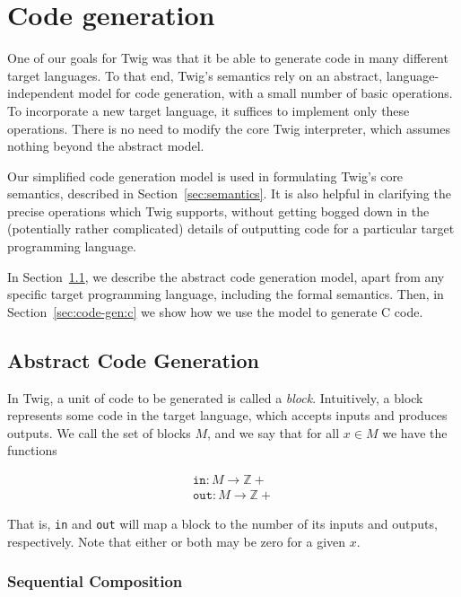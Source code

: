 
\section{Code generation}
\label{sec:code-gen}

One of our goals for Twig was that it be able to generate code in many different target languages. To that end, Twig's semantics rely on an abstract, language-independent model for code generation, with a small number of basic operations. To incorporate a new target language, it suffices to implement only these operations. There is no need to modify the core Twig interpreter, which assumes nothing beyond the abstract model.

Our simplified code generation model is used in formulating Twig's core semantics, described in Section~\ref{sec:semantics}. It is also helpful in clarifying the precise operations which Twig supports, without getting bogged down in the (potentially rather complicated) details of outputting code for a particular target programming language.

In Section~\ref{sec:code-gen:abstract}, we describe the abstract code generation model, apart from any specific target programming language, including the formal semantics. Then, in Section~\ref{sec:code-gen:c} we show how we use the model to generate C code.

\subsection{Abstract Code Generation}
\label{sec:code-gen:abstract}

In Twig, a unit of code to be generated is called a \emph{block}. Intuitively, a block represents some code in the target language, which accepts inputs and produces outputs. We call the set of blocks $M$, and we say that for all $x \in M$ we have the functions 

\begin{eqnarray*}
\mathtt{in}  : M \to \mathbb{Z}+\\
\mathtt{out} : M \to \mathbb{Z}+
\end{eqnarray*}

That is, \texttt{in} and \texttt{out} will map a block to the  number of its inputs and outputs, respectively. Note that either or both may be zero for a given $x$.

\subsubsection{Sequential Composition}

